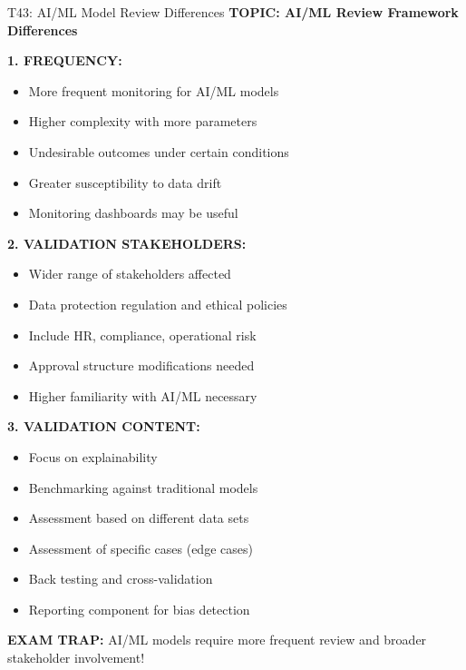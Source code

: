\documentclass[8pt]{beamer}
\begin{document}
	\begin{frame}{T43: AI/ML Model Review Differences}
		\fontsize{6.5}{7.5}\selectfont
		\textbf{TOPIC: AI/ML Review Framework Differences}
		
		\vspace{0.1cm}
		\textbf{1. FREQUENCY:}
		\begin{itemize}
			\item More frequent monitoring for AI/ML models
			\item Higher complexity with more parameters
			\item Undesirable outcomes under certain conditions
			\item Greater susceptibility to data drift
			\item Monitoring dashboards may be useful
		\end{itemize}
		
		\vspace{0.1cm}
		\textbf{2. VALIDATION STAKEHOLDERS:}
		\begin{itemize}
			\item Wider range of stakeholders affected
			\item Data protection regulation and ethical policies
			\item Include HR, compliance, operational risk
			\item Approval structure modifications needed
			\item Higher familiarity with AI/ML necessary
		\end{itemize}
		
		\vspace{0.1cm}
		\textbf{3. VALIDATION CONTENT:}
		\begin{itemize}
			\item Focus on explainability
			\item Benchmarking against traditional models
			\item Assessment based on different data sets
			\item Assessment of specific cases (edge cases)
			\item Back testing and cross-validation
			\item Reporting component for bias detection
		\end{itemize}
		
		\textcolor{myred}{\textbf{EXAM TRAP:}} AI/ML models require \textcolor{myblue}{more frequent review and broader stakeholder involvement}!
	\end{frame}
	
\end{document}
